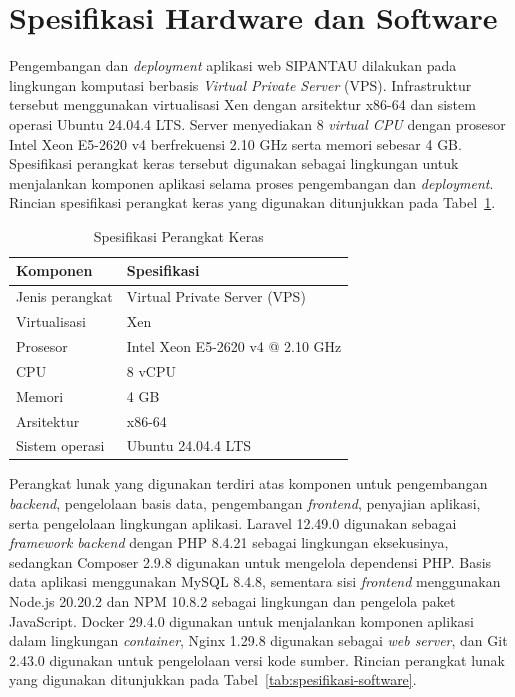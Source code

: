 \section{Spesifikasi Hardware dan Software}

Pengembangan dan \textit{deployment} aplikasi web SIPANTAU dilakukan pada lingkungan komputasi berbasis \textit{Virtual Private Server} (VPS). Infrastruktur tersebut menggunakan virtualisasi Xen dengan arsitektur x86-64 dan sistem operasi Ubuntu 24.04.4 LTS. Server menyediakan 8 \textit{virtual CPU} dengan prosesor Intel Xeon E5-2620 v4 berfrekuensi 2.10 GHz serta memori sebesar 4 GB. Spesifikasi perangkat keras tersebut digunakan sebagai lingkungan untuk menjalankan komponen aplikasi selama proses pengembangan dan \textit{deployment}. Rincian spesifikasi perangkat keras yang digunakan ditunjukkan pada Tabel~\ref{tab:spesifikasi-hardware}.

\begin{table}[H]
    \centering
    \caption{Spesifikasi Perangkat Keras}
    \label{tab:spesifikasi-hardware}
    \begin{tabular}{|l|l|}
        \hline
        \textbf{Komponen} & \textbf{Spesifikasi} \\ \hline
        Jenis perangkat & Virtual Private Server (VPS) \\ \hline
        Virtualisasi & Xen \\ \hline
        Prosesor & Intel Xeon E5-2620 v4 @ 2.10 GHz \\ \hline
        CPU & 8 vCPU \\ \hline
        Memori & 4 GB \\ \hline
        Arsitektur & x86-64 \\ \hline
        Sistem operasi & Ubuntu 24.04.4 LTS \\ \hline
    \end{tabular}
\end{table}

Perangkat lunak yang digunakan terdiri atas komponen untuk pengembangan \textit{backend}, pengelolaan basis data, pengembangan \textit{frontend}, penyajian aplikasi, serta pengelolaan lingkungan aplikasi. Laravel 12.49.0 digunakan sebagai \textit{framework backend} dengan PHP 8.4.21 sebagai lingkungan eksekusinya, sedangkan Composer 2.9.8 digunakan untuk mengelola dependensi PHP. Basis data aplikasi menggunakan MySQL 8.4.8, sementara sisi \textit{frontend} menggunakan Node.js 20.20.2 dan NPM 10.8.2 sebagai lingkungan dan pengelola paket JavaScript. Docker 29.4.0 digunakan untuk menjalankan komponen aplikasi dalam lingkungan \textit{container}, Nginx 1.29.8 digunakan sebagai \textit{web server}, dan Git 2.43.0 digunakan untuk pengelolaan versi kode sumber. Rincian perangkat lunak yang digunakan ditunjukkan pada Tabel~\ref{tab:spesifikasi-software}.

